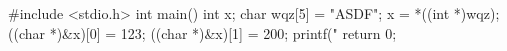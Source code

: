 \documentclass{article}
\begin{document}
#include <stdio.h>
int main() {
  int x;
  char wqz[5] = "ASDF";
  x = *((int *)wqz);
  ((char *)&x)[0] = 123;
  ((char *)&x)[1] = 200;
  printf("%
  return 0;
}
\end{document}
